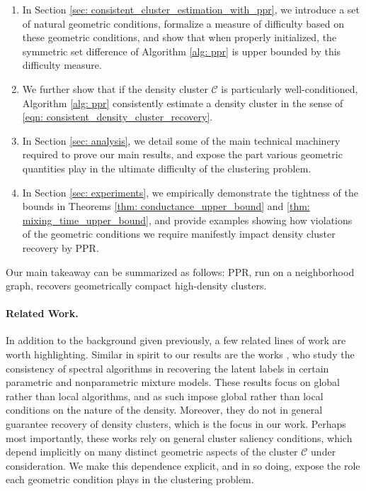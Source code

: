 \documentclass{article}
\newcommand{\1}{\mathbf{1}}
\newcommand{\Cset}{\mathcal{C}}
\newcommand{\ppr}{{\sc PPR}}
\theoremstyle{aldenthm}
\theoremstyle{aldenrmrk}
\begin{document}
\begin{enumerate}
	\item In Section \ref{sec: consistent_cluster_estimation_with_ppr}, we introduce a set of natural geometric conditions, formalize a measure of difficulty based on these geometric conditions, and show that when properly initialized, the symmetric set difference of Algorithm \ref{alg: ppr} is upper bounded by this difficulty measure.
	
	\item We further show that if the density cluster $\Cset$ is particularly well-conditioned, Algorithm \ref{alg: ppr} consistently estimate a density cluster in the sense of \eqref{eqn: consistent_density_cluster_recovery}.
	
	\item In Section \ref{sec: analysis}, we detail some of the main technical machinery required to prove our main results, and expose the part various geometric quantities play in the ultimate difficulty of the clustering problem.
	
	\item In Section \ref{sec: experiments}, we empirically
	demonstrate the tightness of the bounds in Theorems \ref{thm: conductance_upper_bound} and \ref{thm: mixing_time_upper_bound}, and provide examples showing how violations of the geometric conditions we require manifestly
	impact density cluster recovery by \ppr.  
\end{enumerate}

Our main takeaway can be summarized as follows: \ppr, run on a neighborhood graph, recovers geometrically compact high-density clusters.

\paragraph{Related Work. }

In addition to the background given previously, a few related lines of work are worth
highlighting. Similar in spirit to our results are the works
\citep{shi2009,schiebinger2015}, who study the consistency of
spectral algorithms in recovering the latent labels in certain parametric and
nonparametric mixture models. These results focus on global rather than local
algorithms, and as such impose global rather than local conditions on the nature
of the density. Moreover, they do not in general guarantee recovery of density
clusters, which is the focus in our work. Perhaps most importantly, these works rely on general cluster saliency conditions, which depend implicitly on many distinct geometric aspects of the cluster $\Cset$ under consideration. We make this dependence explicit, and in so doing, expose the role each geometric condition plays in the clustering problem.
\end{document}

